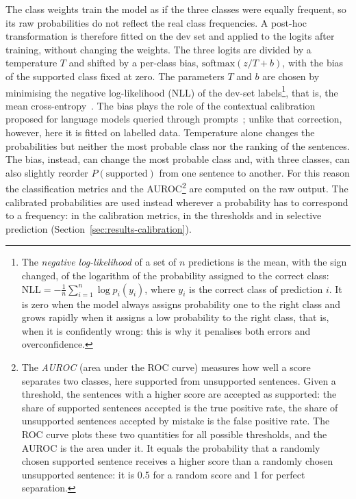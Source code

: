 The class weights train the model as if the three classes were equally frequent, so its raw probabilities do not
reflect the real class frequencies. A post-hoc transformation is therefore fitted on the dev set and applied to the
logits after training, without changing the weights. The three logits are divided by a temperature $T$ and shifted by
a per-class bias, $\mathrm{softmax}(z / T + b)$, with the bias of the supported class fixed at zero. The parameters $T$
and $b$ are chosen by minimising the negative log-likelihood (NLL) of the dev-set
labels\footnote{The \emph{negative log-likelihood} of a set of $n$ predictions is the mean, with the sign changed, of the logarithm of the probability assigned to the correct class: $\mathrm{NLL} = -\frac{1}{n}\sum_{i=1}^{n} \log p_i(y_i)$, where $y_i$ is the correct class of prediction $i$. It is zero when the model always assigns probability one to the right class and grows rapidly when it assigns a low probability to the right class, that is, when it is confidently wrong: this is why it penalises both errors and overconfidence.}, that is, the mean cross-entropy~\cite{guo2017calibration}. The bias plays the role of the contextual calibration proposed for
language models queried through prompts~\cite{zhao2021calibrate}; unlike that correction, however, here it is fitted
on labelled data. Temperature alone changes the probabilities but neither the most probable class nor the ranking of
the sentences. The bias, instead, can change the most probable class and, with three classes, can also slightly
reorder $P(\text{supported})$ from one sentence to another. For this reason the classification metrics and the
AUROC\footnote{The \emph{AUROC} (area under the ROC curve) measures how well a score separates two classes, here
supported from unsupported sentences. Given a threshold, the sentences with a higher score are accepted as supported:
the share of supported sentences accepted is the true positive rate, the share of unsupported sentences accepted by
mistake is the false positive rate. The ROC curve plots these two quantities for all possible thresholds, and the
AUROC is the area under it. It equals the probability that a randomly chosen supported sentence receives a higher
score than a randomly chosen unsupported sentence: it is 0.5 for a random score and 1 for perfect separation.} are
computed on the raw output. The calibrated probabilities are used instead wherever a probability has to correspond to
a frequency: in the calibration metrics, in the thresholds and in selective prediction
(Section~\ref{sec:results-calibration}).

